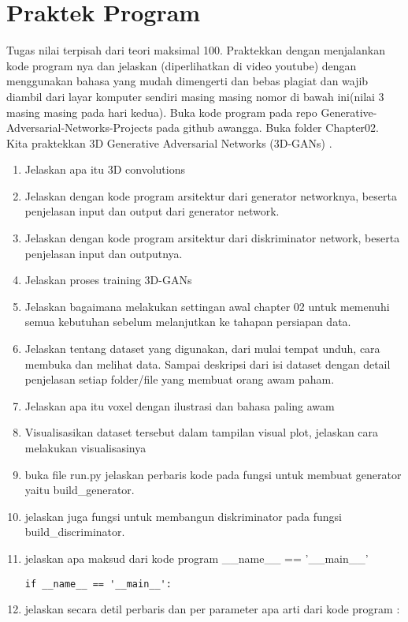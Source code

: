 \section{Praktek Program}
Tugas nilai terpisah dari teori maksimal 100. Praktekkan dengan menjalankan kode program nya dan jelaskan (diperlihatkan di video youtube) dengan menggunakan bahasa yang mudah dimengerti dan bebas plagiat dan wajib diambil dari layar komputer sendiri masing masing nomor di bawah ini(nilai 3 masing masing pada hari kedua). Buka kode program pada repo Generative-Adversarial-Networks-Projects pada github awangga. Buka folder Chapter02. Kita praktekkan 3D Generative Adversarial Networks (3D-GANs) .
\begin{enumerate}
\item
Jelaskan apa itu 3D convolutions
\item
Jelaskan dengan kode program arsitektur dari generator networknya, beserta penjelasan input dan output dari generator network.
\item
Jelaskan dengan kode program arsitektur dari diskriminator network, beserta penjelasan input dan outputnya.
\item 
Jelaskan proses training 3D-GANs
\item
Jelaskan bagaimana melakukan settingan awal chapter 02 untuk memenuhi semua kebutuhan sebelum melanjutkan ke tahapan persiapan data.
\item
Jelaskan tentang dataset yang digunakan, dari mulai tempat unduh, cara membuka dan melihat data. Sampai deskripsi dari isi dataset dengan detail penjelasan setiap folder/file yang membuat orang awam paham.
\item
Jelaskan apa itu voxel dengan ilustrasi dan bahasa paling awam
\item
Visualisasikan dataset tersebut dalam tampilan visual plot, jelaskan cara melakukan visualisasinya
\item
buka file run.py jelaskan perbaris kode pada fungsi untuk membuat generator yaitu build\_generator.
\item
jelaskan juga fungsi untuk membangun diskriminator pada fungsi build\_discriminator.
\item
jelaskan apa maksud dari kode program \_\_name\_\_ == '\_\_main\_\_'
\begin{lstlisting}[caption=Kode program utama,label={lst:8.1}]
if __name__ == '__main__':
\end{lstlisting}
\item
jelaskan secara detil perbaris dan per parameter apa arti dari kode program :

\end{enumerate}
